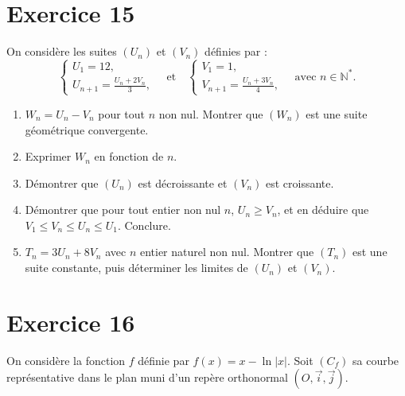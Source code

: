 \documentclass[a4paper,11pt]{article}
\begin{document}
\section*{Exercice 15}

On considère les suites \((U_n)\) et \((V_n)\) définies par :
\[
\begin{cases}
U_1 = 12, \\
U_{n+1} = \frac{U_n + 2V_n}{3},
\end{cases}
\quad \text{et} \quad
\begin{cases}
V_1 = 1, \\
V_{n+1} = \frac{U_n + 3V_n}{4},
\end{cases}
\quad \text{avec } n \in \mathbb{N}^*.
\]

\begin{enumerate}
    \item \(W_n = U_n - V_n\) pour tout \(n\) non nul. Montrer que \((W_n)\) est une suite géométrique convergente.

    \item Exprimer \(W_n\) en fonction de \(n\).

    \item Démontrer que \((U_n)\) est décroissante et \((V_n)\) est croissante.

    \item Démontrer que pour tout entier non nul \(n\), \(U_n \geq V_n\), et en déduire que \(V_1 \leq V_n \leq U_n \leq U_1\). Conclure.

    \item \(T_n = 3U_n + 8V_n\) avec \(n\) entier naturel non nul. Montrer que \((T_n)\) est une suite constante, puis déterminer les limites de \((U_n)\) et \((V_n)\).
\end{enumerate}

\section*{Exercice 16}

On considère la fonction \(f\) définie par \(f(x) = x - \ln|x|\). Soit \((C_f)\) sa courbe représentative dans le plan muni d’un repère orthonormal \((O, \vec{i}, \vec{j})\).
\end{document}
